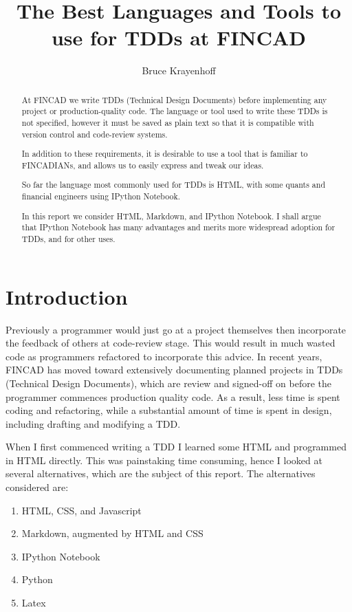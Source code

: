 \documentclass[]{article}
\title{The Best Languages and Tools to use for TDDs at FINCAD}
\author{Bruce Krayenhoff}
\begin{document}
\maketitle

\begin{abstract}
At FINCAD we write TDDs (Technical Design Documents) before implementing any project or production-quality code.  The language or tool used to write these TDDs is not specified, however it must be saved as plain text so that it is compatible with version control and code-review systems.

In addition to these requirements, it is desirable to use a tool that is familiar to FINCADIANs, and allows us to easily express and tweak our ideas.

So far the language most commonly used for TDDs is HTML, with some quants and financial engineers using IPython Notebook.

In this report we consider HTML, Markdown, and IPython Notebook.  I shall argue that IPython Notebook has many advantages and merits more widespread adoption for TDDs, and for other uses.
\end{abstract}

\section{Introduction}
Previously a programmer would just go at a project themselves then incorporate the feedback of others at code-review stage.  This would result in much wasted code as programmers refactored to incorporate this advice. In recent years, FINCAD has moved toward extensively documenting planned projects in TDDs (Technical Design Documents), which are review and signed-off on before the programmer commences production quality code.  As a result, less time is spent coding and refactoring, while a substantial amount of time is spent in design, including drafting and modifying a TDD.

When I first commenced writing a TDD I learned some HTML and programmed in HTML directly. This was painstaking time consuming, hence I looked at several alternatives, which are the subject of this report.  The alternatives considered are:

\begin{enumerate}
	\item HTML, CSS, and Javascript
	\item Markdown, augmented by HTML and CSS
	\item IPython Notebook
	\item Python
	\item Latex
\end{enumerate}
\end{document}

